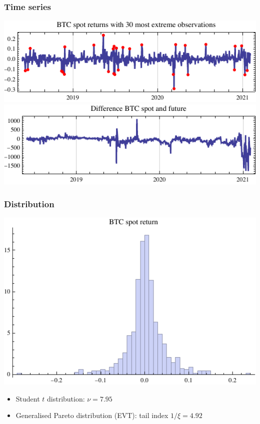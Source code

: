 \documentclass[10pt,mathserif,notes=show]{beamer}
\renewcommand{\(}{\begin{columns}}
\renewcommand{\)}{\end{columns}}
\newcommand{\<}[1]{\begin{column}{#1}}
\renewcommand{\>}{\end{column}}
\theoremstyle{definition}
\begin{document}
\begin{frame}
  \frametitle{Time series}
  \begin{center}
    \includegraphics[scale=1]{../_pics/btc_series.pdf}\\
    \includegraphics[scale=1]{../_pics/btc_vs_future_series.pdf}    
  \end{center}
\end{frame}


\begin{frame}
  \frametitle{Distribution}
  \begin{center}
    \includegraphics[scale=1]{../_pics/btc_hist.pdf}
  \end{center}
  \begin{itemize}
  \item Student $t$ distribution: $\nu=7.95$
  \item Generalised Pareto distribution (EVT): tail index $1/\xi=4.92$ 
  \end{itemize}
\end{frame}
\end{document}
